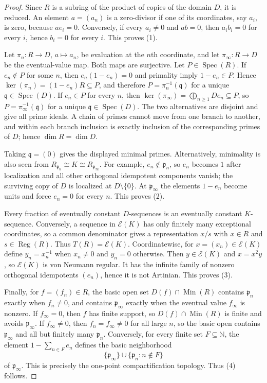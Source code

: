 \documentclass[11pt]{article}
\theoremstyle{definition}
\theoremstyle{remark}
\newcommand{\Reg}{\operatorname{Reg}}
\newcommand{\Min}{\operatorname{Min}}
\newcommand{\Spec}{\operatorname{Spec}}
\newcommand{\EC}{\mathcal E}
\begin{document}
\begin{proof}
Since $R$ is a subring of the product of copies of the domain $D$, it is
reduced.  An element $a=(a_n)$ is a zero-divisor if one of its coordinates,
say $a_i$, is zero, because $ae_i=0$.  Conversely, if every $a_i\ne0$ and
$ab=0$, then $a_ib_i=0$ for every $i$, hence $b_i=0$ for every $i$.  This
proves (1).

Let $\pi_n:R\to D$, $a\mapsto a_n$, be evaluation at the $n$th coordinate,
and let $\pi_\infty:R\to D$ be the eventual-value map.  Both maps are
surjective.  Let $P\in\Spec(R)$.  If $e_n\notin P$ for some $n$, then
$e_n(1-e_n)=0$ and primality imply $1-e_n\in P$.  Hence
$\ker(\pi_n)=(1-e_n)R\subseteq P$, and therefore
$P=\pi_n^{-1}(\mathfrak q)$ for a unique $\mathfrak q\in\Spec(D)$.  If
$e_n\in P$ for every $n$, then
$\ker(\pi_\infty)=\bigoplus_{n\ge1}De_n\subseteq P$, so
$P=\pi_\infty^{-1}(\mathfrak q)$ for a unique
$\mathfrak q\in\Spec(D)$.  The two alternatives are disjoint and give all
prime ideals.  A chain of primes cannot move from one branch to another, and
within each branch inclusion is exactly inclusion of the corresponding primes
of $D$; hence $\dim R=\dim D$.

Taking $\mathfrak q=(0)$ gives the displayed minimal primes.  Alternatively,
minimality is also seen from
$R_{\mathfrak p_n}\cong K\cong R_{\mathfrak p_\infty}$.  For example,
$e_n\notin\mathfrak p_n$, so $e_n$ becomes $1$ after localization and all
other orthogonal idempotent components vanish; the surviving copy of $D$ is
localized at $D\setminus\{0\}$.  At $\mathfrak p_\infty$ the elements
$1-e_n$ become units and force $e_n=0$ for every $n$.  This proves (2).

Every fraction of eventually constant $D$-sequences is an eventually constant
$K$-sequence.  Conversely, a sequence in $\EC(K)$ has only finitely many
exceptional coordinates, so a common denominator gives a representation
$x/s$ with $x\in R$ and $s\in\Reg(R)$.  Thus $T(R)=\EC(K)$.  Coordinatewise,
for $x=(x_n)\in\EC(K)$ define $y_n=x_n^{-1}$ when $x_n\ne0$ and $y_n=0$
otherwise.  Then $y\in\EC(K)$ and $x=x^2y$, so $\EC(K)$ is von Neumann
regular.  It has the infinite family of nonzero orthogonal idempotents
$(e_n)$, hence it is not Artinian.  This proves (3).

Finally, for $f=(f_n)\in R$, the basic open set $D(f)\cap\Min(R)$ contains
$\mathfrak p_n$ exactly when $f_n\ne0$, and contains $\mathfrak p_\infty$
exactly when the eventual value $f_\infty$ is nonzero.  If $f_\infty=0$, then
$f$ has finite support, so $D(f)\cap\Min(R)$ is finite and avoids
$\mathfrak p_\infty$.  If $f_\infty\ne0$, then $f_n=f_\infty\ne0$ for all
large $n$, so the basic open contains $\mathfrak p_\infty$ and all but
finitely many $\mathfrak p_n$.  Conversely, for every finite set
$F\subseteq\mathbb N$, the element $1-\sum_{n\in F}e_n$ defines the basic
neighborhood
\[
 \{\mathfrak p_\infty\}\cup
 \{\mathfrak p_n:n\notin F\}
\]
of $\mathfrak p_\infty$.  This is precisely the one-point compactification
topology.  Thus (4) follows.
\end{proof}
\end{document}
